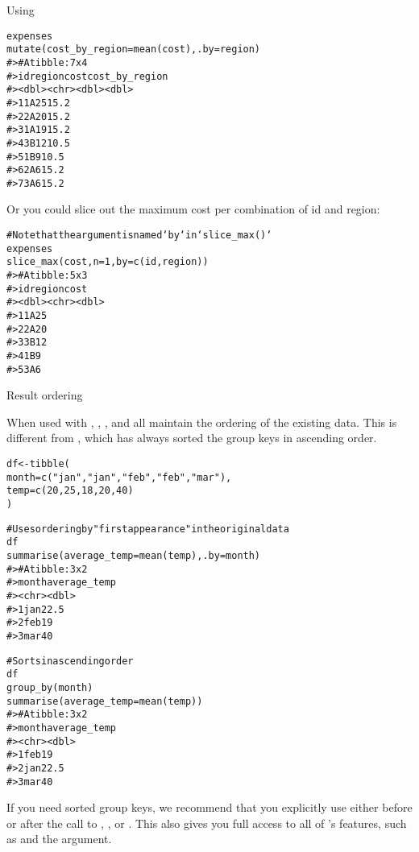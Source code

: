 \documentclass[a4paper]{book}
\begin{document}
\begin{Description}
\begin{SubSection}{Using }
\begin{alltt}expenses %>%
  mutate(cost_by_region = mean(cost), .by = region)
#> # A tibble: 7 x 4
#>      id region  cost cost_by_region
#>   <dbl> <chr>  <dbl>          <dbl>
#> 1     1 A         25           15.2
#> 2     2 A         20           15.2
#> 3     1 A         19           15.2
#> 4     3 B         12           10.5
#> 5     1 B          9           10.5
#> 6     2 A          6           15.2
#> 7     3 A          6           15.2
\end{alltt}


Or you could slice out the maximum cost per combination of id and region:

\begin{alltt}# Note that the argument is named `by` in `slice_max()`
expenses %>%
  slice_max(cost, n = 1, by = c(id, region))
#> # A tibble: 5 x 3
#>      id region  cost
#>   <dbl> <chr>  <dbl>
#> 1     1 A         25
#> 2     2 A         20
#> 3     3 B         12
#> 4     1 B          9
#> 5     3 A          6
\end{alltt}

\end{SubSection}


%
\begin{SubSection}{Result ordering}

When used with , , , and  all maintain the ordering of the existing data.
This is different from , which has always sorted the group keys in ascending order.

\begin{alltt}df <- tibble(
  month = c("jan", "jan", "feb", "feb", "mar"),
  temp = c(20, 25, 18, 20, 40)
)

# Uses ordering by "first appearance" in the original data
df %>%
  summarise(average_temp = mean(temp), .by = month)
#> # A tibble: 3 x 2
#>   month average_temp
#>   <chr>        <dbl>
#> 1 jan           22.5
#> 2 feb           19  
#> 3 mar           40

# Sorts in ascending order
df %>%
  group_by(month) %>%
  summarise(average_temp = mean(temp))
#> # A tibble: 3 x 2
#>   month average_temp
#>   <chr>        <dbl>
#> 1 feb           19  
#> 2 jan           22.5
#> 3 mar           40
\end{alltt}


If you need sorted group keys, we recommend that you explicitly use  either before or after the call to , , or .
This also gives you full access to all of 's features, such as  and the  argument.
\end{SubSection}



\end{Description}
\end{document}
